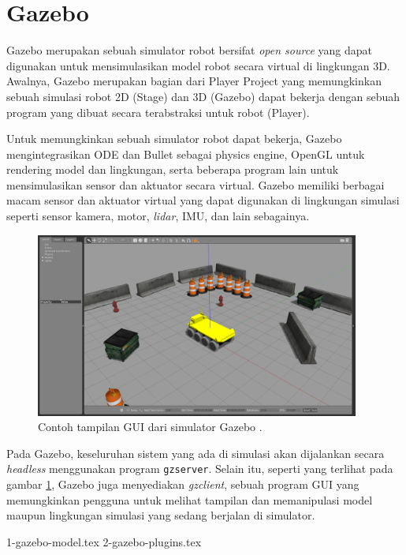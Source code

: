 \section{Gazebo}
\label{sec:gazebo}

Gazebo \citep{cit:koenig2004} merupakan sebuah simulator robot bersifat \emph{open source} yang dapat digunakan untuk mensimulasikan model robot secara virtual di lingkungan 3D.
Awalnya, Gazebo merupakan bagian dari Player Project \citep{cit:gerkey2003} yang memungkinkan sebuah simulasi robot 2D (Stage) dan 3D (Gazebo) dapat bekerja dengan sebuah program yang dibuat secara terabstraksi untuk robot (Player).

Untuk memungkinkan sebuah simulator robot dapat bekerja,
  Gazebo mengintegrasikan ODE dan Bullet sebagai physics engine,
  OpenGL untuk rendering model dan lingkungan,
  serta beberapa program lain untuk mensimulasikan sensor dan aktuator secara virtual.
Gazebo memiliki berbagai macam sensor dan aktuator virtual yang dapat digunakan di lingkungan simulasi seperti sensor kamera, motor, \emph{lidar}, IMU, dan lain sebagainya.

\begin{figure}[ht]
  \centering
  \includegraphics[width=0.95\textwidth,keepaspectratio]{gambar/contoh-gui-gazebo.png}
  \caption{Contoh tampilan GUI dari simulator Gazebo \citep{url:gazeboexample}.}
  \label{fig:contohguigazebo}
\end{figure}

Pada Gazebo, keseluruhan sistem yang ada di simulasi akan dijalankan secara \emph{headless} menggunakan program \lstinline{gzserver}.
Selain itu, seperti yang terlihat pada gambar \ref{fig:contohguigazebo},
  Gazebo juga menyediakan \emph{gzclient}, sebuah program GUI yang memungkinkan pengguna untuk melihat tampilan dan memanipulasi model maupun lingkungan simulasi yang sedang berjalan di simulator.

{1-gazebo-model.tex}
{2-gazebo-plugins.tex}
